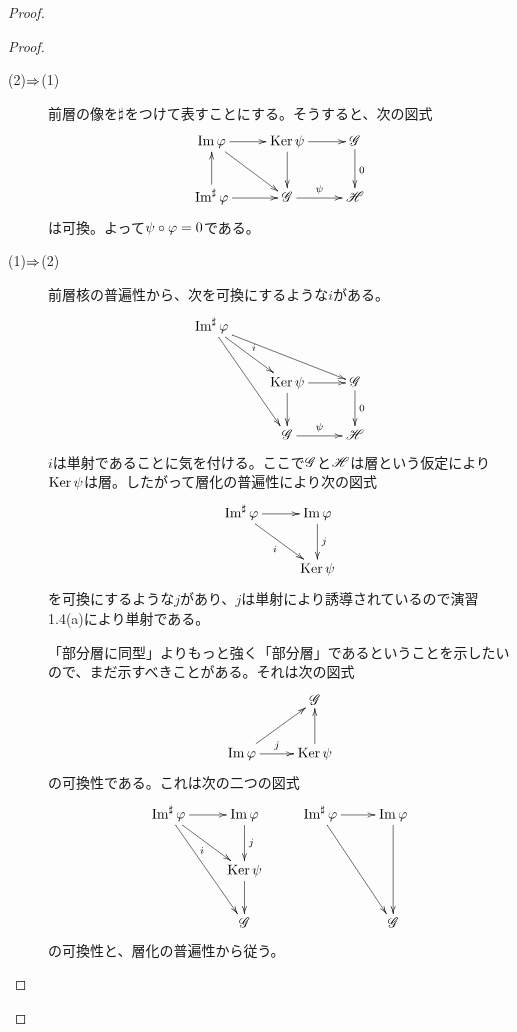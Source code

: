 \begin{proof}
  \begin{proof} ${}$
    \begin{description}
      \item[(2)$\Rightarrow$(1)] 前層の像を$\sharp$をつけて表すことにする。そうすると、次の図式
      \[
      \xymatrix{
      \Im \vp \ar[r]  \ar[rd] & \Ker \psi \ar[r] \ar[d] & \scrg \ar[d]^0 \\
      \Im^{\sh} \vp \ar[r] \ar[u] & \scrg \ar[r]^-{\psi} & \scrh
      }
      \]
      は可換。よって$\psi \circ {\varphi} = 0$である。
      \item[(1)$\Rightarrow$(2)] 前層核の普遍性から、次を可換にするような$i$がある。
      \[
      \xymatrix{
      \Im^{\sh} \vp \ar[rrd] \ar[ddr] \ar[rd]^-{i} & & \\
       & \Ker \psi \ar[r] \ar[d] & \scrg \ar[d]^-{0} \\
       & \scrg \ar[r]^-{\psi} & \scrh
      }
      \]
      $i$は単射であることに気を付ける。ここで$\mathscr{G}$と$\mathscr{H}$は層という仮定により$\operatorname{Ker} \psi$は層。したがって層化の普遍性により次の図式
      \[
      \xymatrix{
      \Im^{\sh} \vp \ar[r] \ar[rd]_-{i} & \Im \vp \ar[d]^-{j} \\
      & \Ker \psi
      }
      \]
      を可換にするような$j$があり、$j$は単射により誘導されているので演習1.4(a)により単射である。

      「部分層に同型」よりもっと強く「部分層」であるということを示したいので、まだ示すべきことがある。それは次の図式
      \[
      \xymatrix{
      & \scrg \\
      \Im \vp \ar[r]^-j \ar[ru] & \Ker \psi \ar[u]
      }
      \]
      の可換性である。これは次の二つの図式
      \[
      \xymatrix{
      \Im^{\sh} \vp \ar[r] \ar[rd]_-i \ar[rdd] & \Im \vp \ar[d]^-j & \Im^{\sh} \vp \ar[r] \ar[rdd] & \Im \vp \ar[dd] \\
      {} & \Ker \psi \ar[d] & {} & { } \\
      {} & \scrg & {} & \scrg
      }
      \]
      の可換性と、層化の普遍性から従う。
    \end{description}
  \end{proof}


\end{proof}
